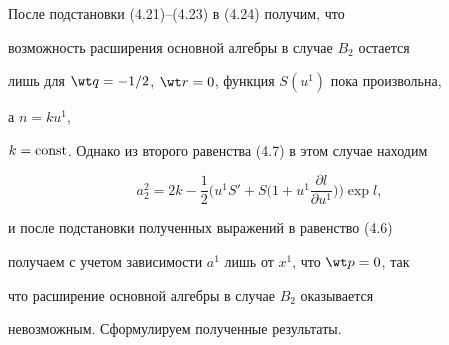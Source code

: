 После подстановки (4.21)--(4.23) в (4.24) получим, что 


возможность расширения основной алгебры в случае $B_2$ остается 


лишь для $\wt q=-1/2$, $\wt r=0$, функция $S(u^1)$ пока произвольна, 


а $n=ku^1$, 


$k=\operatorname{const}$. Однако из второго равенства (4.7) в этом случае находим 


$$ 


a^2_2=2k-\frac{1}{2}\bigg(u^1S'+S\bigg(1+u^1 


\frac{\partial l}{\partial u^1}\bigg)\bigg)\exp l, 


$$ 


и после подстановки полученных выражений в равенство (4.6) 


получаем с учетом зависимости $a^1$ лишь от $x^1$, что $\wt p=0$, так 


что расширение основной алгебры в случае $B_2$ оказывается 


невозможным. Сформулируем полученные результаты. 


 


